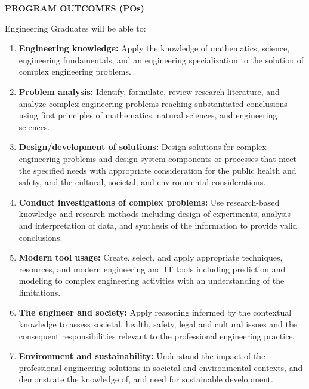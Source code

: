 \newpage
\thispagestyle{empty}
\begin{center}
\textbf{\Large PROGRAM OUTCOMES (POs)}
\end{center}

\vspace{0.5cm}

Engineering Graduates will be able to:

\begin{enumerate}
    \item \textbf{Engineering knowledge:} Apply the knowledge of mathematics, science, engineering fundamentals, and an engineering specialization to the solution of complex engineering problems.
    
    \item \textbf{Problem analysis:} Identify, formulate, review research literature, and analyze complex engineering problems reaching substantiated conclusions using first principles of mathematics, natural sciences, and engineering sciences.
    
    \item \textbf{Design/development of solutions:} Design solutions for complex engineering problems and design system components or processes that meet the specified needs with appropriate consideration for the public health and safety, and the cultural, societal, and environmental considerations.
    
    \item \textbf{Conduct investigations of complex problems:} Use research-based knowledge and research methods including design of experiments, analysis and interpretation of data, and synthesis of the information to provide valid conclusions.
    
    \item \textbf{Modern tool usage:} Create, select, and apply appropriate techniques, resources, and modern engineering and IT tools including prediction and modeling to complex engineering activities with an understanding of the limitations.
    
    \item \textbf{The engineer and society:} Apply reasoning informed by the contextual knowledge to assess societal, health, safety, legal and cultural issues and the consequent responsibilities relevant to the professional engineering practice.
    
    \item \textbf{Environment and sustainability:} Understand the impact of the professional engineering solutions in societal and environmental contexts, and demonstrate the knowledge of, and need for sustainable development.
    

\end{enumerate}
